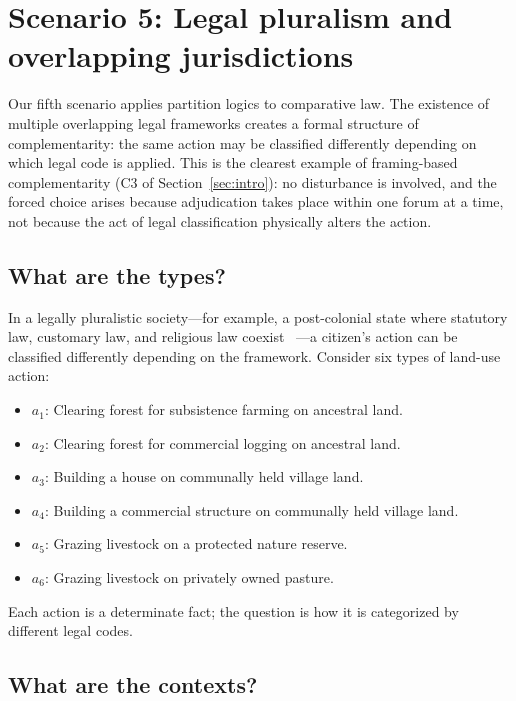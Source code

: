 \documentclass{article}
\begin{document}
\section{Scenario 5: Legal pluralism and overlapping jurisdictions}
\label{sec:legal}

Our fifth scenario applies partition logics to comparative law. The
existence of multiple overlapping legal frameworks creates a formal
structure of complementarity: the same action may be classified
differently depending on which legal code is applied. This is the
clearest example of framing-based complementarity (C3 of
Section~\ref{sec:intro}): no disturbance is involved, and the
forced choice arises because adjudication takes place within one
forum at a time, not because the act of legal classification
physically alters the action.

\subsection{What are the types?}

In a legally pluralistic society---for example, a post-colonial
state where statutory law, customary law, and religious law coexist
~\cite{Merry1988,Griffiths1986}---a citizen's action can be
classified differently depending on the framework. Consider six
types of land-use action:
\begin{itemize}
\item $a_1$: Clearing forest for subsistence farming on ancestral
land.
\item $a_2$: Clearing forest for commercial logging on ancestral
land.
\item $a_3$: Building a house on communally held village land.
\item $a_4$: Building a commercial structure on communally held
village land.
\item $a_5$: Grazing livestock on a protected nature reserve.
\item $a_6$: Grazing livestock on privately owned pasture.
\end{itemize}
Each action is a determinate fact; the question is how it is
categorized by different legal codes.

\subsection{What are the contexts?}
\end{document}
